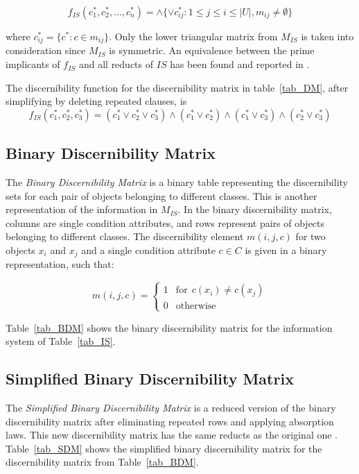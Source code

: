 \documentclass[citenumber]{llncs}
\begin{document}
  \begin{equation}
  	f_{IS}(c_1^*, c_2^*,...,c_n^*)=\wedge \lbrace \vee c_{ij}^* : 1 \leq j \leq i \leq |U|, 
  									m_{ij} \neq \emptyset \rbrace
  \end{equation}

  where $c_{ij}^*=\lbrace c^* : c \in m_{ij} \rbrace$. Only the lower triangular matrix from $M_{IS}$ is
  taken into consideration since $M_{IS}$ is symmetric. An equivalence between the prime implicants of
  $f_{IS}$ and all reducts of $IS$ has been found and reported in \cite{Pawlak07}.
  
  The discernibility function for the discernibility matrix in table~\ref{tab_DM}, after simplifying by 
  deleting repeated clauses, is  
  $$f_{IS}(c_1^*,c_2^*,c_3^*)=(c_1^* \vee c_2^* \vee c_3^*) \wedge (c_1^* \vee c_2^*) 
   \wedge (c_1^* \vee c_3^*) \wedge (c_2^* \vee c_3^*) $$
  
  
\subsection{Binary Discernibility Matrix}
  The \textit{Binary Discernibility Matrix} is a binary table representing the discernibility sets for each pair of objects belonging to different classes. This is another representation of the information in $M_{IS}$. In the binary discernibility matrix, columns are single condition attributes, and rows represent pairs of objects belonging to different classes. The discernibility element $m(i, j, c)$ for two objects $x_i$ and $x_j$ and a single condition attribute $c \in C$ is given in a binary representation, such that:
  
  \begin{equation}
  	m(i, j, c)=\left\lbrace\begin{array}{cl}
  			1 & \mathrm{for~~}c(x_i) \neq c(x_j)\\
  			0 & \mathrm{otherwise} 
  	\end{array}\right.
  \end{equation} 
  
  Table~\ref{tab_BDM} shows the binary discernibility matrix for the information system of Table~\ref{tab_IS}.  
  
  
\subsection{Simplified Binary Discernibility Matrix}
  The \textit{Simplified Binary Discernibility Matrix} is a reduced version of the binary discernibility matrix after
  eliminating repeated rows and applying absorption laws. This new discernibility matrix has the same reducts
  as the original one \cite{Yao09}. Table~\ref{tab_SDM} shows the simplified binary discernibility matrix for the
  discernibility matrix from Table~\ref{tab_BDM}.
  
\end{document}
